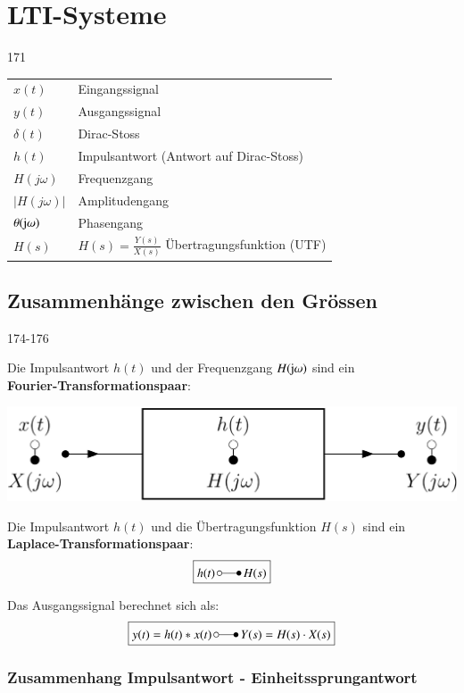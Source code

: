 \section{LTI-Systeme}{171}

\begin{tabular}{ll}
    $x(t)$                  & Eingangssignal \\
    $y(t)$                  & Ausgangssignal \\
    $\delta(t)$             & Dirac-Stoss \\
    $h(t)$                  & Impulsantwort (Antwort auf Dirac-Stoss) \\
    $H(j \omega)$           & Frequenzgang \\
    $|H(j \omega)|$         & Amplitudengang \\
    $\theta(\mathrm{j} \omega)$  & Phasengang \\
    $H(s)$                  & $H(s) = \frac{Y(s)}{X(s)}$ Übertragungsfunktion (UTF)
\end{tabular}


\subsection{Zusammenhänge zwischen den Grössen}{174-176}
\label{Zusammenhang}

Die Impulsantwort $h(t)$ und der Frequenzgang $H(\mathrm{j} \omega)$ sind ein \\
\textbf{Fourier-Transformationspaar}:

\begin{center}
    \includegraphics[width=0.7\columnwidth]{images/frequenzgang_impulsantwort.png} \\
\end{center}

Die Impulsantwort $h(t)$ und die Übertragungsfunktion $H(s)$ sind ein\\
\textbf{Laplace-Transformationspaar}:
$$ \boxed{ h(t) \, \laplace \, H(s) } $$

Das Ausgangssignal berechnet sich als: 
$$ \boxed{ y(t) = h(t) * x(t) \, \laplace \, Y(s) = H(s) \cdot X(s) } $$


\subsubsection{Zusammenhang Impulsantwort - Einheitssprungantwort}

